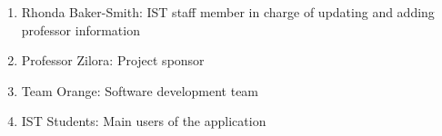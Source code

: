 \begin{enumerate}
	\item Rhonda Baker-Smith: IST staff member in charge of updating and adding professor information
	\item Professor Zilora: Project sponsor
	\item Team Orange: Software development team
	\item IST Students: Main users of the application
\end{enumerate}